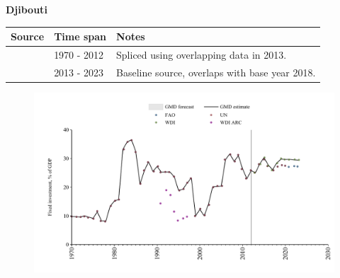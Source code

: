\documentclass[12pt,a4paper,landscape]{article}
\begin{document}
\begin{adjustbox}{max totalsize={\paperwidth}{\paperheight},center}
\begin{minipage}[t][\textheight][t]{\textwidth}
\vspace*{0.5cm}
{}
\begin{center}
{\Large\bfseries Djibouti}
\end{center}
\vspace{0.5cm}
\begin{table}[H]
\centering
\small
\begin{tabular}{|l|l|l|}
\hline
\textbf{Source} & \textbf{Time span} & \textbf{Notes} \\
\hline
\rowcolor{white}\cite{UN}& 1970 - 2012 &Spliced using overlapping data in 2013.\\
\rowcolor{lightgray}\cite{WDI}& 2013 - 2023 &Baseline source, overlaps with base year 2018.\\
\hline
\end{tabular}
\end{table}
\begin{figure}[H]
\centering
\includegraphics[width=\textwidth,height=0.6\textheight,keepaspectratio]{graphs/DJI_finv_GDP.pdf}
\end{figure}
\end{minipage}
\end{adjustbox}
\end{document}
